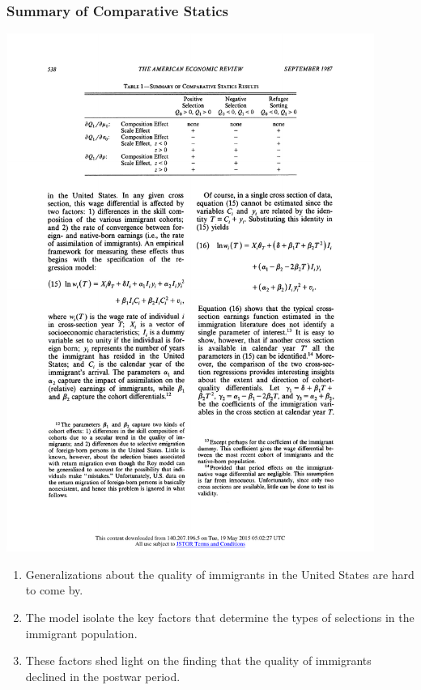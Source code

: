 \documentclass[10pt]{beamer}
\begin{document}
\begin{frame}[c]\frametitle{Summary of Comparative Statics}

\centerline{\includegraphics[width=0.9\textwidth]{summary.pdf}}
\begin{enumerate}
    \item Generalizations about the quality of immigrants in the United States are hard to come by.
    \item The model isolate the key factors that determine the types of selections in the immigrant population.
    \item These factors shed light on the finding that the quality of immigrants declined in the postwar period.
\end{enumerate}

\end{frame}
\end{document}
